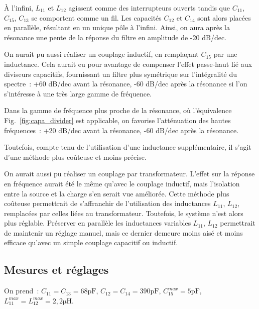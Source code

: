 \documentclass{article}
\begin{document}
À l'infini, $L_{11}$ et $L_{12}$ agissent comme des interrupteurs ouverts tandis que $C_{11}$, $C_{15}$, $C_{13}$ se comportent comme un fil. Les capacités $C_{12}$ et $C_{14}$ sont alors placées en parallèle, résultant en un unique pôle à l'infini. Ainsi, on aura après la résonance une pente de la réponse du filtre en amplitude de -20 dB/dec.



On aurait pu aussi réaliser un couplage inductif, en remplaçant $C_{15}$ par une inductance. Cela aurait eu pour avantage de compenser l'effet passe-haut lié aux diviseurs capacitifs, fournissant un filtre plus symétrique sur l'intégralité du spectre~: +60 dB/dec avant la résonance, -60 dB/dec après la résonance si l'on s'intéresse à une très large gamme de fréquence.

Dans la gamme de fréquence plus proche de la résonance, où l'équivalence Fig.~\ref{fig:capa_divider} est applicable, on favorise l'atténuation des hautes fréquences~: +20 dB/dec avant la résonance, -60 dB/dec après la résonance.

Toutefois, compte tenu de l'utilisation d'une inductance supplémentaire, il s'agit d'une méthode plus coûteuse et moins précise.

On aurait aussi pu réaliser un couplage par transformateur. L'effet sur la réponse en fréquence aurait été le même qu'avec le couplage inductif, mais l'isolation entre la source et la charge s'en serait vue améliorée. Cette méthode plus coûteuse permettrait de s'affranchir de l'utilisation des inductances $L_{11}$, $L_{12}$, remplacées par celles liées au transformateur. Toutefois, le système n'est alors plus réglable. Préserver en parallèle les inductances variables $L_{11}$, $L_{12}$ permettrait de maintenir un réglage manuel, mais ce dernier demeure moins aisé et moins efficace qu'avec un simple couplage capacitif ou inductif.






\subsection{Mesures et réglages}


On prend~: $C_{11}=C_{13}=68\mathrm{pF}$, $C_{12}=C_{14}=390\mathrm{pF}$, $C_{15}^{max}=5\mathrm{pF}$, $L_{11}^{max}=L_{12}^{max}=2,2\mathrm{\mu H}$.
\end{document}
